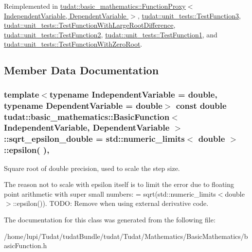Reimplemented in \hyperlink{classtudat_1_1basic__mathematics_1_1FunctionProxy_a5f79c3fef685b7b2eaaec22661680d61}{tudat\+::basic\+\_\+mathematics\+::\+Function\+Proxy$<$ Independent\+Variable, Dependent\+Variable $>$}, \hyperlink{structtudat_1_1unit__tests_1_1TestFunction3_ad2d7f08fa955641521a436cc280252cc}{tudat\+::unit\+\_\+tests\+::\+Test\+Function3}, \hyperlink{structtudat_1_1unit__tests_1_1TestFunctionWithLargeRootDifference_aad326dd34b4429048eb91d4d817892a2}{tudat\+::unit\+\_\+tests\+::\+Test\+Function\+With\+Large\+Root\+Difference}, \hyperlink{structtudat_1_1unit__tests_1_1TestFunction2_ad4de6c3724f2c6684ece65b7628c3e24}{tudat\+::unit\+\_\+tests\+::\+Test\+Function2}, \hyperlink{structtudat_1_1unit__tests_1_1TestFunction1_ad5c6ff20438f21b73c9148897c4e5c3c}{tudat\+::unit\+\_\+tests\+::\+Test\+Function1}, and \hyperlink{structtudat_1_1unit__tests_1_1TestFunctionWithZeroRoot_a8fb918e0e9e380dd493683892579336a}{tudat\+::unit\+\_\+tests\+::\+Test\+Function\+With\+Zero\+Root}.



\subsection{Member Data Documentation}
\subsubsection[{\texorpdfstring{sqrt\+\_\+epsilon\+\_\+double}{sqrt_epsilon_double}}]{\setlength{\rightskip}{0pt plus 5cm}template$<$typename Independent\+Variable = double, typename Dependent\+Variable = double$>$ const double {\bf tudat\+::basic\+\_\+mathematics\+::\+Basic\+Function}$<$ Independent\+Variable, Dependent\+Variable $>$\+::sqrt\+\_\+epsilon\+\_\+double = std\+::numeric\+\_\+limits$<$ double $>$\+::epsilon( )\hspace{0.3cm}{\ttfamily [static]}, {\ttfamily [protected]}}\hypertarget{classtudat_1_1basic__mathematics_1_1BasicFunction_a9d9d85a5dd2bb72ec73619c126593f0d}{}\label{classtudat_1_1basic__mathematics_1_1BasicFunction_a9d9d85a5dd2bb72ec73619c126593f0d}


Square root of double precision, used to scale the step size. 

The reason not to scale with epsilon itself is to limit the error due to floating point arithmetic with super small numbers\+: = sqrt(std\+::numeric\+\_\+limits$<$double$>$\+::epsilon()). T\+O\+DO\+: Remove when using external derivative code. 

The documentation for this class was generated from the following file\+:\begin{DoxyCompactItemize}
\item 
/home/lupi/\+Tudat/tudat\+Bundle/tudat/\+Tudat/\+Mathematics/\+Basic\+Mathematics/basic\+Function.\+h\end{DoxyCompactItemize}
